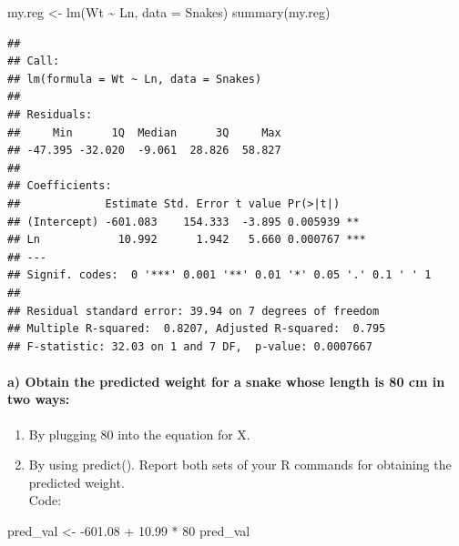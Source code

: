 \documentclass[
]{article}
\newenvironment{Shaded}{\begin{snugshade}}{\end{snugshade}}
\newcommand{\AttributeTok}[1]{\textcolor[rgb]{0.77,0.63,0.00}{#1}}
\newcommand{\DecValTok}[1]{\textcolor[rgb]{0.00,0.00,0.81}{#1}}
\newcommand{\FloatTok}[1]{\textcolor[rgb]{0.00,0.00,0.81}{#1}}
\newcommand{\FunctionTok}[1]{\textcolor[rgb]{0.00,0.00,0.00}{#1}}
\newcommand{\NormalTok}[1]{#1}
\newcommand{\OtherTok}[1]{\textcolor[rgb]{0.56,0.35,0.01}{#1}}
\newcommand{\SpecialCharTok}[1]{\textcolor[rgb]{0.00,0.00,0.00}{#1}}
\providecommand{\tightlist}{%
  \setlength{\itemsep}{0pt}\setlength{\parskip}{0pt}}
\begin{document}
\begin{Shaded}
\begin{Highlighting}[]
\NormalTok{my.reg }\OtherTok{\textless{}{-}} \FunctionTok{lm}\NormalTok{(Wt }\SpecialCharTok{\textasciitilde{}}\NormalTok{ Ln, }\AttributeTok{data =}\NormalTok{ Snakes)}
\FunctionTok{summary}\NormalTok{(my.reg)}
\end{Highlighting}
\end{Shaded}

\begin{verbatim}
## 
## Call:
## lm(formula = Wt ~ Ln, data = Snakes)
## 
## Residuals:
##     Min      1Q  Median      3Q     Max 
## -47.395 -32.020  -9.061  28.826  58.827 
## 
## Coefficients:
##             Estimate Std. Error t value Pr(>|t|)    
## (Intercept) -601.083    154.333  -3.895 0.005939 ** 
## Ln            10.992      1.942   5.660 0.000767 ***
## ---
## Signif. codes:  0 '***' 0.001 '**' 0.01 '*' 0.05 '.' 0.1 ' ' 1
## 
## Residual standard error: 39.94 on 7 degrees of freedom
## Multiple R-squared:  0.8207, Adjusted R-squared:  0.795 
## F-statistic: 32.03 on 1 and 7 DF,  p-value: 0.0007667
\end{verbatim}

\hypertarget{a-obtain-the-predicted-weight-for-a-snake-whose-length-is-80-cm-in-two-ways}{%
\paragraph{a) Obtain the predicted weight for a snake whose length is 80
cm in two
ways:}\label{a-obtain-the-predicted-weight-for-a-snake-whose-length-is-80-cm-in-two-ways}}

\begin{enumerate}
\def\labelenumi{\arabic{enumi}.}
\tightlist
\item
  By plugging 80 into the equation for X.
\item
  By using predict(). Report both sets of your R commands for obtaining
  the predicted weight.\\
  Code:
\end{enumerate}

\begin{Shaded}
\begin{Highlighting}[]
\NormalTok{pred\_val }\OtherTok{\textless{}{-}} \SpecialCharTok{{-}}\FloatTok{601.08} \SpecialCharTok{+} \FloatTok{10.99} \SpecialCharTok{*} \DecValTok{80}
\NormalTok{pred\_val}
\end{Highlighting}
\end{Shaded}
\end{document}
